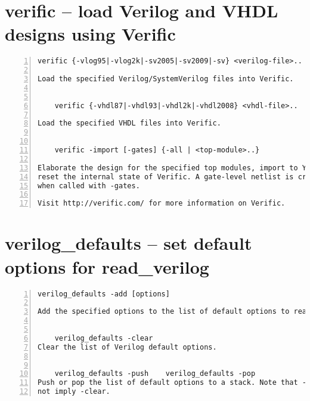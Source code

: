 \section{verific -- load Verilog and VHDL designs using Verific}
\label{cmd:verific}
\begin{lstlisting}[numbers=left,frame=single]
    verific {-vlog95|-vlog2k|-sv2005|-sv2009|-sv} <verilog-file>..

Load the specified Verilog/SystemVerilog files into Verific.


    verific {-vhdl87|-vhdl93|-vhdl2k|-vhdl2008} <vhdl-file>..

Load the specified VHDL files into Verific.


    verific -import [-gates] {-all | <top-module>..}

Elaborate the design for the specified top modules, import to Yosys and
reset the internal state of Verific. A gate-level netlist is created
when called with -gates.

Visit http://verific.com/ for more information on Verific.
\end{lstlisting}

\section{verilog\_defaults -- set default options for read\_verilog}
\label{cmd:verilog_defaults}
\begin{lstlisting}[numbers=left,frame=single]
    verilog_defaults -add [options]

Add the specified options to the list of default options to read_verilog.


    verilog_defaults -clear
Clear the list of Verilog default options.


    verilog_defaults -push    verilog_defaults -pop
Push or pop the list of default options to a stack. Note that -push does
not imply -clear.
\end{lstlisting}

